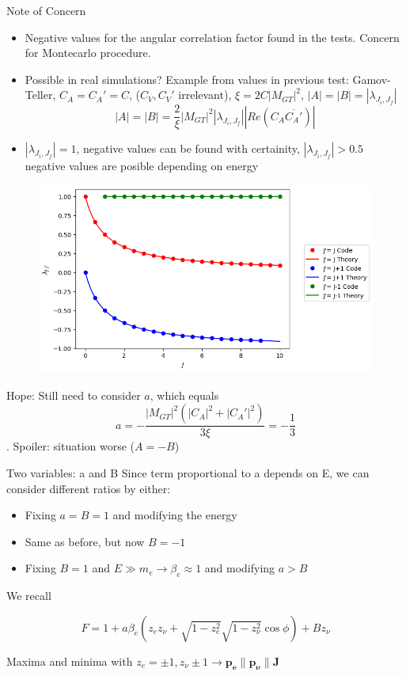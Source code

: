 \documentclass{beamer}
\begin{document}
\begin{frame}{Note of Concern}
	\begin{itemize}
		\item Negative values for the angular correlation factor found in the tests. Concern for Montecarlo procedure.
		\item Possible in real simulations? Example from values in previous test:
		Gamov-Teller, $C_A = C_A' = C$, ($C_V, C_V'$ irrelevant), $\xi=2C|M_{GT}|^2$, $|A| = |B| = |\lambda_{J_i,J_f}|$ 
		$$|A| = |B| = \frac{2}{\xi}|M_{GT}|^2|\lambda_{J_i,J_f}||Re(C_A\overline{C_A'})|$$
		\item $|\lambda_{J_i,J_f}| = 1$, negative values can be found with certainity, $|\lambda_{J_i,J_f}| > 0.5$ negative values are posible depending on energy

	\end{itemize}
\end{frame}
\begin{frame}
	\begin{figure}
		\centering
		\includegraphics[height=0.5\paperheight]{plots/lambda_test_result.png}
	\end{figure}
	 Hope: Still need to consider $a$, which equals 
	 $$a = -\frac{|M_{GT}|^2(|C_A|^2+|C_A'|^2)}{3\xi}=-\frac13$$. 
	 Spoiler: situation worse ($A=-B$)
\end{frame}
\begin{frame}{Two variables: a and B}
	Since term proportional to a depends on E, we can consider different ratios by either:
	\begin{itemize}
		\item Fixing $a = B = 1$ and modifying the energy
		\item Same as before, but now $B = -1$
		\item Fixing $B = 1$ and $E \gg m_e \rightarrow \beta_e \approx 1$ and modifying $a > B$
	\end{itemize}
	
	We recall
	
	$$F = 1 + a\beta_e(z_ez_\nu + \sqrt{1-z^2_e}\sqrt{1-z^2_\nu}\cos \phi) + Bz_\nu$$
	
	Maxima and minima with $z_e=\pm1,z_\nu \pm1 \rightarrow \boldsymbol{p_e} \parallel \boldsymbol{p_\nu} \parallel \boldsymbol{J}$  
	
\end{frame}
\end{document}
